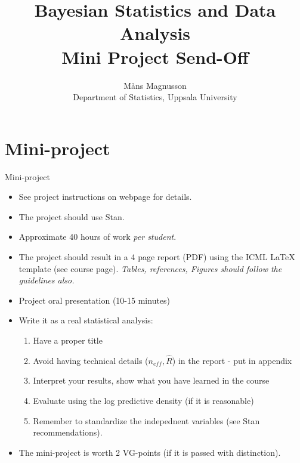 \documentclass[10pt]{beamer}
\title[]{{\color{black}Bayesian Statistics and Data Analysis \\ Mini Project Send-Off}}
\author[]{M{\aa}ns Magnusson \\ Department of Statistics, Uppsala University}
\date{}
\begin{document}
\frame{\titlepage
}



\section{Mini-project}
\frame{\sectionpage}

\begin{frame}{Mini-project}

\begin{itemize}
\item See project instructions on webpage for details.
\pause
\item The project should use Stan.
\item Approximate 40 hours of work \emph{per student}.\pause
\item The project should result in a 4 page report (PDF) using the ICML LaTeX template (see course page). \emph{Tables, references, Figures should follow the guidelines also.}\pause
\item Project oral presentation (10-15 minutes) \pause
\item Write it as a real statistical analysis:
\begin{enumerate}
\item Have a proper title\pause
\item Avoid having technical details ($n_{eff},\hat{R}$) in the report - put in appendix\pause
\item Interpret your results, show what you have learned in the course\pause
\item Evaluate using the log predictive density (if it is reasonable)
\item Remember to standardize the indepednent variables (see Stan recommendations).
\end{enumerate}
\item The mini-project is worth 2 VG-points (if it is passed with distinction).
\end{itemize}
\end{frame}



\end{document}
